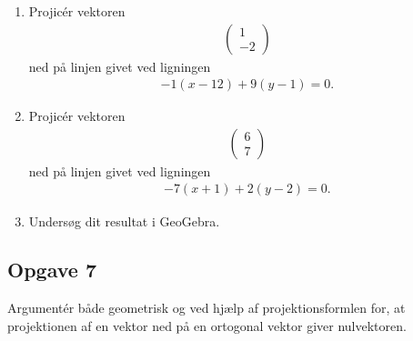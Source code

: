 \begin{enumerate}[label=\roman*)]
	\item Projicér vektoren 
	\begin{align*}
		\begin{pmatrix}
			1 \\ -2
		\end{pmatrix}
	\end{align*}
	ned på linjen givet ved ligningen
	\begin{align*}
		-1(x-12) + 9(y-1) = 0.
	\end{align*}
	\item Projicér vektoren 
	\begin{align*}
		\begin{pmatrix}
			6 \\  7
		\end{pmatrix}
	\end{align*}
	ned på linjen givet ved ligningen
	\begin{align*}
		-7(x+1) + 2(y-2) = 0.
	\end{align*}
	\item Undersøg dit resultat i GeoGebra.
\end{enumerate}

\subsection*{Opgave 7}
Argumentér både geometrisk og ved hjælp af projektionsformlen for, at projektionen af en vektor ned på en ortogonal vektor giver nulvektoren. 
